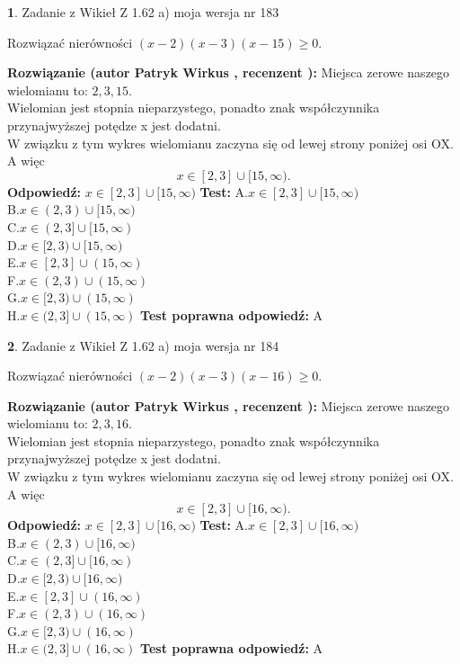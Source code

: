 \documentclass[12pt, a4paper]{article}
\theoremstyle{definition} %
\newtheorem{zad}{}
\newcommand{\zadStart}[1]{\begin{zad}#1\newline}
\newcommand{\zadStop}{\end{zad}}
\newcommand{\rozwStart}[2]{\noindent \textbf{Rozwiązanie (autor #1 , recenzent #2): }\newline}
\newcommand{\rozwStop}{\newline}
\newcommand{\odpStart}{\noindent \textbf{Odpowiedź:}\newline}
\newcommand{\odpStop}{\newline}
\newcommand{\testStart}{\noindent \textbf{Test:}\newline}
\newcommand{\testStop}{\newline}
\newcommand{\kluczStart}{\noindent \textbf{Test poprawna odpowiedź:}\newline}
\newcommand{\kluczStop}{\newline}
\begin{document}
\zadStart{Zadanie z Wikieł Z 1.62 a) moja wersja nr 183}

Rozwiązać nierówności $(x-2)(x-3)(x-15)\ge0$.
\zadStop
\rozwStart{Patryk Wirkus}{}
Miejsca zerowe naszego wielomianu to: $2, 3, 15$.\\
Wielomian jest stopnia nieparzystego, ponadto znak współczynnika przy\linebreak najwyższej potędze x jest dodatni.\\ W związku z tym wykres wielomianu zaczyna się od lewej strony poniżej osi OX. A więc $$x \in [2,3] \cup [15,\infty).$$
\rozwStop
\odpStart
$x \in [2,3] \cup [15,\infty)$
\odpStop
\testStart
A.$x \in [2,3] \cup [15,\infty)$\\
B.$x \in (2,3) \cup [15,\infty)$\\
C.$x \in (2,3] \cup [15,\infty)$\\
D.$x \in [2,3) \cup [15,\infty)$\\
E.$x \in [2,3] \cup (15,\infty)$\\
F.$x \in (2,3) \cup (15,\infty)$\\
G.$x \in [2,3) \cup (15,\infty)$\\
H.$x \in (2,3] \cup (15,\infty)$
\testStop
\kluczStart
A
\kluczStop



\zadStart{Zadanie z Wikieł Z 1.62 a) moja wersja nr 184}

Rozwiązać nierówności $(x-2)(x-3)(x-16)\ge0$.
\zadStop
\rozwStart{Patryk Wirkus}{}
Miejsca zerowe naszego wielomianu to: $2, 3, 16$.\\
Wielomian jest stopnia nieparzystego, ponadto znak współczynnika przy\linebreak najwyższej potędze x jest dodatni.\\ W związku z tym wykres wielomianu zaczyna się od lewej strony poniżej osi OX. A więc $$x \in [2,3] \cup [16,\infty).$$
\rozwStop
\odpStart
$x \in [2,3] \cup [16,\infty)$
\odpStop
\testStart
A.$x \in [2,3] \cup [16,\infty)$\\
B.$x \in (2,3) \cup [16,\infty)$\\
C.$x \in (2,3] \cup [16,\infty)$\\
D.$x \in [2,3) \cup [16,\infty)$\\
E.$x \in [2,3] \cup (16,\infty)$\\
F.$x \in (2,3) \cup (16,\infty)$\\
G.$x \in [2,3) \cup (16,\infty)$\\
H.$x \in (2,3] \cup (16,\infty)$
\testStop
\kluczStart
A
\kluczStop
\end{document}
